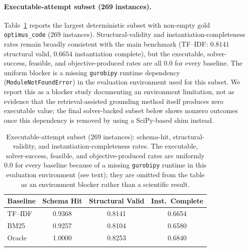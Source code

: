\documentclass[pdflatex,sn-basic,Numbered]{sn-jnl}
\begin{document}
\paragraph{Executable-attempt subset (269 instances).} Table~\ref{tab:eng-executable} reports the largest deterministic subset with non-empty gold \texttt{optimus\_code} (269 instances). Structural-validity and instantiation-completeness rates remain broadly consistent with the main benchmark (TF--IDF: $0.8141$ structural valid, $0.6654$ instantiation complete), but the executable, solver-success, feasible, and objective-produced rates are all $0.0$ for every baseline. The uniform blocker is a missing \texttt{gurobipy} runtime dependency (\texttt{ModuleNotFoundError}) in the evaluation environment used for this subset. We report this as a blocker study documenting an environment limitation, not as evidence that the retrieval-assisted grounding method itself produces zero executable value; the final solver-backed subset below shows nonzero outcomes once this dependency is removed by using a SciPy-based shim instead.

\begin{table}[t]
\centering
\caption{Executable-attempt subset (269 instances): schema-hit, structural-validity, and instantiation-completeness rates. The executable, solver-success, feasible, and objective-produced rates are uniformly $0.0$ for every baseline because of a missing \texttt{gurobipy} runtime in this evaluation environment (see text); they are omitted from the table as an environment blocker rather than a scientific result.}
\label{tab:eng-executable}
\small
\begin{tabular}{lccc}
  \toprule
  Baseline & Schema Hit & Structural Valid & Inst.\ Complete \\
  \midrule
  TF--IDF & 0.9368 & 0.8141 & 0.6654 \\
  BM25    & 0.9257 & 0.8104 & 0.6580 \\
  Oracle  & 1.0000 & 0.8253 & 0.6840 \\
  \botrule
\end{tabular}
\end{table}
\end{document}
